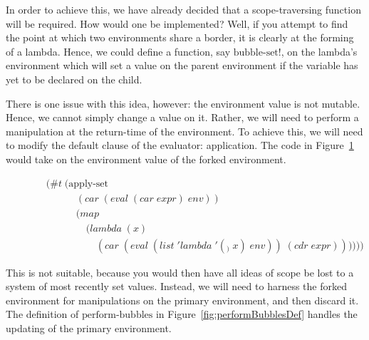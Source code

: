 In order to achieve this, we have already decided that a scope-traversing
function will be required. How would one be implemented? Well, if you attempt
to find the point at which two environments share a border, it is clearly at
the forming of a lambda. Hence, we could define a function, say 
$\text{bubble-set!}$, on the lambda's environment which will set a value on the
parent environment if the variable has yet to be declared on the child.

There is one issue with this idea, however: the environment value is not
mutable. Hence, we cannot simply change a value on it. Rather, we will need to
perform a manipulation at the return-time of the environment. To achieve this,
we will need to modify the default clause of the evaluator: application. The
code in Figure~\ref{fig:takeForkedEnvApply} would take on the environment value
of the forked environment.

\begin{figure}[htp]
\caption{}\label{fig:takeForkedEnvApply}
\begin{align*}
& (\#t \; (\text{apply-set} \; 
\\& \qquad \quad (car \; (eval \; (car \; expr) \; env))
\\& \qquad \quad (map \; 
\\& \qquad \qquad (lambda \; (x) \; 
\\& \qquad \qquad \quad (car \; (eval \; (list \; 'lambda \; '(_) \; x) \; env)) \; (cdr \; expr))))))
\end{align*}
\end{figure}

This is not suitable, because you would then have all ideas of scope be lost to
a system of most recently set values. Instead, we will need to harness the
forked environment for manipulations on the primary environment, and then
discard it. The definition of $\text{perform-bubbles}$ in
Figure~\ref{fig:performBubblesDef} handles the updating of the primary
environment.

